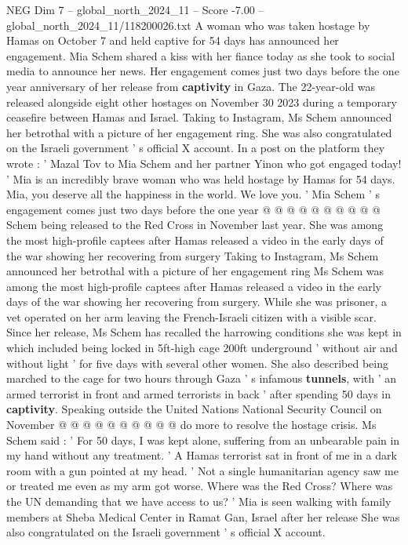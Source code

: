 \begin{textsample}{NEG Dim 7 – global\_north\_2024\_11 – Score -7.00 – global\_north\_2024\_11/118200026.txt}  \label{ex:f7_neg_252}
A woman who was taken hostage by Hamas on October 7 and held captive for 54 days has announced her engagement.
Mia Schem shared a kiss with her fiance today as she took to social media to announce her news.
Her engagement comes just two days before the one year anniversary of her release from \textbf{captivity} in Gaza.
The 22-year-old was released alongside eight other hostages on November 30 2023 during a temporary ceasefire between Hamas and Israel.
Taking to Instagram, Ms Schem announced her betrothal with a picture of her engagement ring.
She was also congratulated on the Israeli government ' s official X account.
In a post on the platform they wrote : ' Mazal Tov to Mia Schem and her partner Yinon who got engaged today! ' Mia is an incredibly brave woman who was held hostage by Hamas for 54 days.
Mia, you deserve all the happiness in the world.
We love you. ' Mia Schem ' s engagement comes just two days before the one year @ @ @ @ @ @ @ @ @ @ Schem being released to the Red Cross in November last year.
She was among the most high-profile captees after Hamas released a video in the early days of the war showing her recovering from surgery Taking to Instagram, Ms Schem announced her betrothal with a picture of her engagement ring Ms Schem was among the most high-profile captees after Hamas released a video in the early days of the war showing her recovering from surgery.
While she was prisoner, a vet operated on her arm leaving the French-Israeli citizen with a visible scar.
Since her release, Ms Schem has recalled the harrowing conditions she was kept in which included being locked in 5ft-high cage 200ft underground ' without air and without light ' for five days with several other women.
She also described being marched to the cage for two hours through Gaza ' s infamous \textbf{tunnels}, with ' an armed terrorist in front and armed terrorists in back ' after spending 50 days in \textbf{captivity}.
Speaking outside the United Nations National Security Council on November @ @ @ @ @ @ @ @ @ @ do more to resolve the hostage crisis.
Ms Schem said : ' For 50 days, I was kept alone, suffering from an unbearable pain in my hand without any treatment. ' A Hamas terrorist sat in front of me in a dark room with a gun pointed at my head. ' Not a single humanitarian agency saw me or treated me even as my arm got worse.
Where was the Red Cross?
Where was the UN demanding that we have access to us? ' Mia is seen walking with family members at Sheba Medical Center in Ramat Gan, Israel after her release She was also congratulated on the Israeli government ' s official X account.

\end{textsample}
